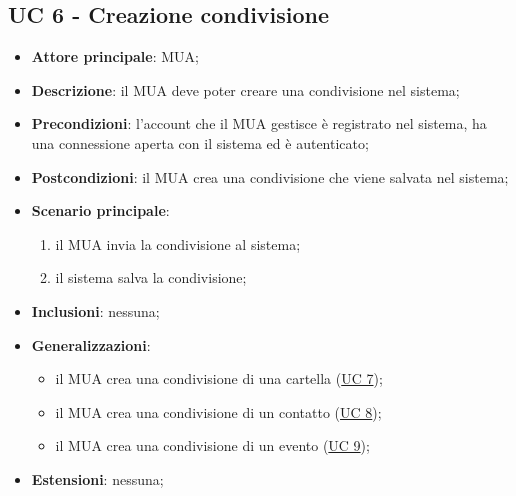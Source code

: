 \subsection{UC 6 - Creazione condivisione} \label{sec:UC6}
    \begin{itemize}
        \item \textbf{Attore principale}: MUA;
        \item \textbf{Descrizione}: il MUA deve poter creare una condivisione nel sistema;
        \item \textbf{Precondizioni}: l’account che il MUA gestisce è registrato nel sistema, ha una connessione aperta con il sistema ed è autenticato;
        \item \textbf{Postcondizioni}: il MUA crea una condivisione che viene salvata nel sistema;
        \item \textbf{Scenario principale}:
        \begin{enumerate}
            \item il MUA invia la condivisione al sistema;
            \item il sistema salva la condivisione;
        \end{enumerate}
    \item \textbf{Inclusioni}: nessuna;
    \item \textbf{Generalizzazioni}:
        \begin{itemize}
            \item il MUA crea una condivisione di una cartella (\hyperref[sec:UC7]{UC 7});
            \item il MUA crea una condivisione di un contatto (\hyperref[sec:UC8]{UC 8});
            \item il MUA crea una condivisione di un evento (\hyperref[sec:UC9]{UC 9});
        \end{itemize}
    \item \textbf{Estensioni}: nessuna;
\end{itemize}
